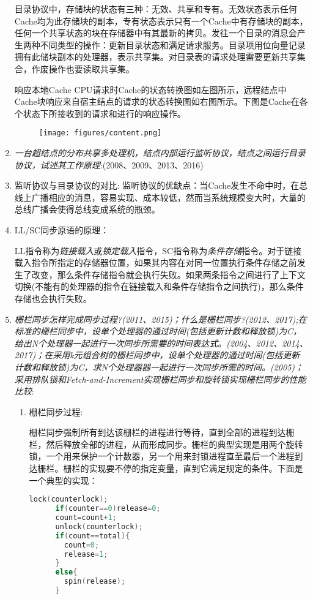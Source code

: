 \documentclass[a4paper]{ctexart}
\begin{document}
\begin{enumerate}
  目录协议中，存储块的状态有三种：无效、共享和专有。无效状态表示任何Cache均为此存储块的副本，专有状态表示只有一个Cache中有存储块的副本，任何一个共享状态的块在存储器中有其最新的拷贝。发往一个目录的消息会产生两种不同类型的操作：更新目录状态和满足请求服务。目录项用位向量记录拥有此储块副本的处理器，表示共享集。对目录表的请求处理需要更新共享集合，作废操作也要读取共享集。

  响应本地Cache CPU请求时Cache的状态转换图如左图所示，远程结点中Cache块响应来自宿主结点的请求的状态转换图如右图所示。下图是Cache在各个状态下所接收到的请求和进行的响应操作。
  
  \begin{figure}[!htbp]
    \centering
    \texttt{[image: figures/content.png]}
  \end{figure}
  
  \item \emph{一台超结点的分布共享多处理机，结点内部运行监听协议，结点之间运行目录协议，试述其工作原理}:(2008、2009、2013、2016)
  
  
  \item {\color{grey}监听协议与目录协议的对比:
  监听协议的优缺点：当Cache发生不命中时，在总线上广播相应的消息，容易实现、成本较低，然而当系统规模变大时，大量的总线广播会使得总线变成系统的瓶颈。}
  
  \item {\color{grey}LL/SC同步原语的原理：
  
  LL指令称为\emph{链接载入}或\emph{锁定载入}指令，SC指令称为\emph{条件存储}指令。对于链接载入指令所指定的存储器位置，如果其内容在对同一位置执行条件存储之前发生了改变，那么条件存储指令就会执行失败。如果两条指令之间进行了上下文切换(不能有的处理器的指令在链接载入和条件存储指令之间执行)，那么条件存储也会执行失败。}
  
  \item \emph{栅栏同步怎样完成同步过程?(2011、2015)；什么是栅栏同步?(2012、2017);在标准的栅栏同步中，设单个处理器的通过时间(包括更新计数和释放锁)为C，给出N个处理器一起进行一次同步所需要的时间表达式。(2004、2012、2014、2017)；在采用k元组合树的栅栏同步中，设单个处理器的通过时间(包括更新计数和释放锁)为C，求N个处理器器一起进行一次同步所需的时间。(2005)；采用排队锁和Fetch-and-Increment实现栅栏同步和旋转锁实现栅栏同步的性能比较}:
  \begin{enumerate}
    \item 栅栏同步过程:
    
    栅栏同步强制所有到达该栅栏的进程进行等待，直到全部的进程到达栅栏，然后释放全部的进程，从而形成同步。栅栏的典型实现是用两个旋转锁，一个用来保护一个计数器，另一个用来封锁进程直至最后一个进程到达栅栏。栅栏的实现要不停的指定变量，直到它满足规定的条件。下面是一个典型的实现：
    \begin {lstlisting}[language=C] 
      lock(counterlock);
      if(counter==0)release=0;
      count=count+1;
      unlock(counterlock);
      if(count==total){
        count=0;
        release=1;
      }
      else{
        spin(release);
      }
    \end{lstlisting}
    

\end{enumerate}
\end{enumerate}
\end{document}
